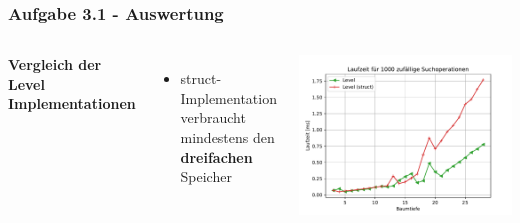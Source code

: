 \documentclass[aspectratio=169]{beamer}
\begin{document}
\begin{frame}
	\frametitle{Aufgabe 3.1 - Auswertung}
	\begin{columns}[c] %
		
		\textbf{Vergleich der Level Implementationen}
		\begin{itemize}
			\item struct-Implementation verbraucht mindestens den \textbf{dreifachen} Speicher
		\end{itemize}
		
		\includegraphics[scale=.6]{level_levelstruct.pdf}
		
		
	\end{columns}
	\end{frame}
	
\end{document}
